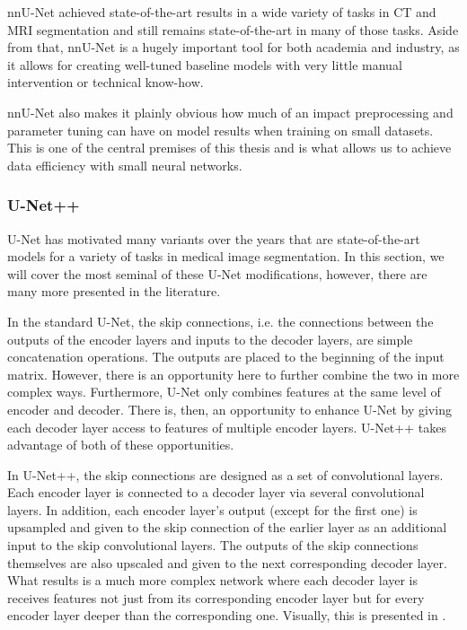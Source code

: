  nnU-Net achieved state-of-the-art results in a wide variety of tasks in CT and MRI segmentation and still remains state-of-the-art in many of those tasks. Aside from that, nnU-Net is a hugely important tool for both academia and industry, as it allows for creating well-tuned baseline models with very little manual intervention or technical know-how.
 
 nnU-Net also makes it plainly obvious how much of an impact preprocessing and parameter tuning can have on model results when training on small datasets. This is one of the central premises of this thesis and is what allows us to achieve data efficiency with small neural networks.
 
 \subsubsection{U-Net++}
 
 U-Net has motivated many variants over the years that are state-of-the-art models for a variety of tasks in medical image segmentation. In this section, we will cover the most seminal of these U-Net modifications, however, there are many more presented in the literature.
 
 In the standard U-Net, the skip connections, i.e. the connections between the outputs of the encoder layers and inputs to the decoder layers, are simple concatenation operations. The outputs are placed to the beginning of the input matrix. However, there is an opportunity here to further combine the two in more complex ways. Furthermore, U-Net only combines features at the same level of encoder and decoder. There is, then, an opportunity to enhance U-Net by giving each decoder layer access to features of multiple encoder layers. U-Net++ \cite{zhou2019unetplusplus} takes advantage of both of these opportunities.
 
 In U-Net++, the skip connections are designed as a set of convolutional layers. Each encoder layer is connected to a decoder layer via several convolutional layers. In addition, each encoder layer's output (except for the first one) is upsampled and given to the skip connection of the earlier layer as an additional input to the skip convolutional layers. The outputs of the skip connections themselves are also upscaled and given to the next corresponding decoder layer. What results is a much more complex network where each decoder layer is receives features not just from its corresponding encoder layer but for every encoder layer deeper than the corresponding one. Visually, this is presented in .
 

